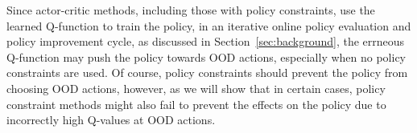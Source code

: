 Since actor-critic methods, including those with policy constraints, use the learned Q-function to train the policy, in an iterative online policy evaluation and policy improvement cycle, as discussed in Section~\ref{sec:background}, the errneous Q-function may push the policy towards OOD actions, especially when no policy constraints are used. Of course, policy constraints should prevent the policy from choosing OOD actions, however, as we will show that in certain cases, policy constraint methods might also fail to prevent the effects on the policy due to incorrectly high Q-values at OOD actions. 



